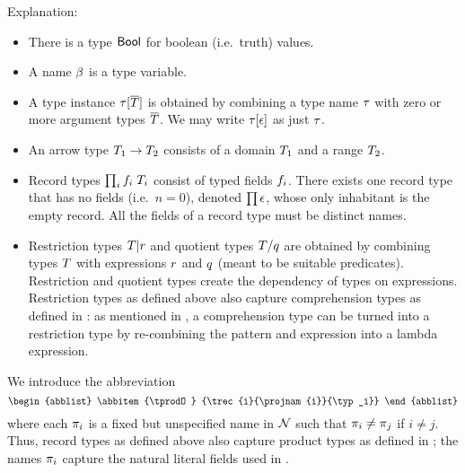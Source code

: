 Explanation:
\begin{itemize}
\item
There is a type $\mathsf{Bool}$ for boolean (i.e.\ truth) values.
\item
A name $\beta$ is a type variable.
\item
A type instance $\tau[\overline{T}]$ is obtained by combining a type name $\tau$ with
zero or more argument types $\overline{T}$. We may write $\tau[\epsilon]$ as
just $\tau$.
\item
An arrow type $T_1\to T_2$ consists of a domain $T_1$ and a range $T_2$.
\item
Record types $\prod_{i}f_i\;T_i$ consist of typed fields $f_i$. There exists one
record type that has no fields (i.e.\ $n=0$), denoted $\prod\epsilon$, whose only
inhabitant is the empty record. All the fields of a record type must be
distinct names.
\item
Restriction types $T|r$ and quotient types $T/q$ are obtained by
combining types $T$ with expressions $r$ and $q$ (meant to be
suitable predicates). Restriction and quotient types create the dependency of
types on expressions. Restriction types as defined above also capture
comprehension types as defined in \cite{lm}: as mentioned in \cite{lm}, a
comprehension type can be turned into a restriction type by re-combining the
pattern and expression into a lambda expression.
\end{itemize}

We introduce the abbreviation
\[
\begin{abblist}
\abbitem{\tprodO}
        {\trec{i}{\projnam{i}}{\typ_i}}
\end{abblist}
\]
where each $\pi_{i}$ is a fixed but unspecified name in $\mathcal{N}$ such that
$\pi_{i}\neq\pi_{j}$ if $i\neq j$. Thus, record types as defined above
also capture product types as defined in \cite{lm}; the names $\pi_{i}$
capture the natural literal fields used in \cite{lm}.

